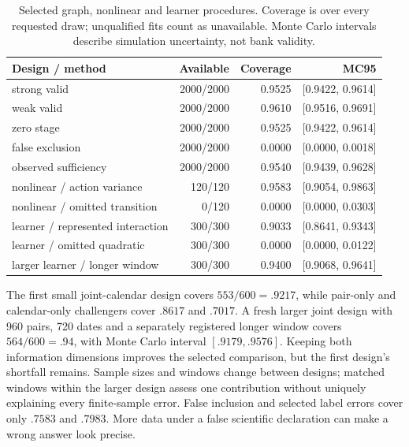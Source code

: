 \begin{table}[htbp]
\centering\small
\begin{tabular}{lrrr}
\toprule
Design / method & Available & Coverage & MC95 \\
\midrule
strong valid & 2000/2000 & 0.9525 & [0.9422, 0.9614] \\
weak valid & 2000/2000 & 0.9610 & [0.9516, 0.9691] \\
zero stage & 2000/2000 & 0.9525 & [0.9422, 0.9614] \\
false exclusion & 2000/2000 & 0.0000 & [0.0000, 0.0018] \\
observed sufficiency & 2000/2000 & 0.9540 & [0.9439, 0.9628] \\
nonlinear / action variance & 120/120 & 0.9583 & [0.9054, 0.9863] \\
nonlinear / omitted transition & 0/120 & 0.0000 & [0.0000, 0.0303] \\
learner / represented interaction & 300/300 & 0.9033 & [0.8641, 0.9343] \\
learner / omitted quadratic & 300/300 & 0.0000 & [0.0000, 0.0122] \\
larger learner / longer window & 300/300 & 0.9400 & [0.9068, 0.9641] \\
\bottomrule
\end{tabular}
\caption{Selected graph, nonlinear and learner procedures. Coverage is over every requested draw; unqualified fits count as unavailable. Monte Carlo intervals describe simulation uncertainty, not bank validity.}
\label{r8:extension-table}
\end{table}




The first small joint-calendar design covers $553/600=.9217$, while pair-only
and calendar-only challengers cover $.8617$ and $.7017$. A fresh larger joint
design with 960 pairs, 720 dates and a separately registered longer window
covers $564/600=.94$, with Monte Carlo interval $[.9179,.9576]$. Keeping both
information dimensions improves the selected comparison, but the first design's
shortfall remains. Sample sizes and windows change between designs; matched
windows within the larger design assess one contribution without uniquely
explaining every finite-sample error. False inclusion and selected label errors
cover only $.7583$ and $.7983$. More data under a false scientific declaration
can make a wrong answer look precise.

